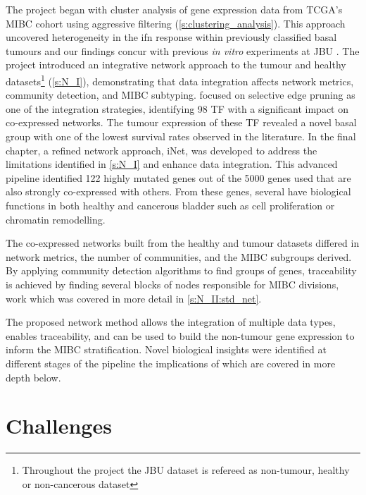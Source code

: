 The project began with cluster analysis of gene expression data from TCGA's MIBC cohort using aggressive filtering (\cref{s:clustering_analysis}). This approach uncovered heterogeneity in the \acrlong{ifn} response within previously classified basal tumours \citep{Robertson2017-mg, Kamoun2020-tj} and our findings concur with previous \textit{in vitro} experiments at JBU \citep{Baker2022-bj}. The project introduced an integrative network approach to the tumour and healthy datasets\footnote{Throughout the project the JBU dataset is refereed as non-tumour, healthy or non-cancerous dataset} (\cref{s:N_I}), demonstrating that data integration affects network metrics, community detection, and MIBC subtyping.  focused on selective edge pruning as one of the integration strategies, identifying 98 TF with a significant impact on co-expressed networks. The tumour expression of these TF revealed a novel basal group with one of the lowest survival rates observed in the literature. In the final chapter, a refined network approach, iNet, was developed to address the limitations identified in \cref{s:N_I} and enhance data integration. This advanced pipeline identified 122 highly mutated genes out of the 5000 genes used that are also strongly co-expressed with others. From these genes, several have biological functions in both healthy and cancerous bladder such as cell proliferation or chromatin remodelling. 

The co-expressed networks built from the healthy and tumour datasets differed in network metrics, the number of communities, and the MIBC subgroups derived. By applying community detection algorithms to find groups of genes, traceability is achieved by finding several blocks of nodes responsible for MIBC divisions, work which was covered in more detail in \cref{s:N_II:std_net}.

% 
The proposed network method allows the integration of multiple data types, enables traceability, and can be used to build the non-tumour gene expression to inform the MIBC stratification. Novel biological insights were identified at different stages of the pipeline the implications of which are covered in more depth below.

\section{Challenges}

